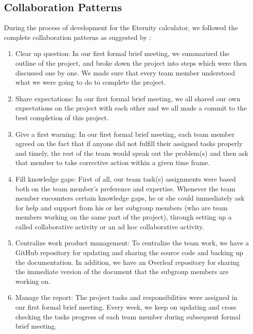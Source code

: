 \documentclass[12pt]{article}
\begin{document}
\subsection{Collaboration Patterns}
During the process of development for the Eternity calculator, we followed the complete collaboration patterns as suggested by \cite{koppe2015improving}:
\begin{enumerate}
    \item Clear up question: \newline
          In our first formal brief meeting, we summarized the outline of the project, and broke down the project into steps which were then discussed one by one. We made sure that every team member understood what we were going to do to complete the project.
    \item Share expectations: \newline
          In our first formal brief meeting, we all shared our own expectations on the project with each other and we all made a commit to the best completion of this project.
    \item Give a first warning: \newline
          In our first formal brief meeting, each team member agreed on the fact that if anyone did not fulfill their assigned tasks properly and timely, the rest of the team would speak out the problem(s) and then ask that member to take corrective action within a given time frame.
    \item Fill knowledge gaps: \newline
          First of all, our team task(s) assignments were based both on the team member's preference and expertise. Whenever the team member encounters certain knowledge gaps, he or she could immediately ask for help and support from his or her subgroup members (who are team members working on the same part of the project), through setting up a called collaborative activity or an ad hoc collaborative activity.
    \item Centralize work product management: \newline
          To centralize the team work, we have a GitHub repository for updating and sharing the source code and backing up the documentation. In addition, we have an Overleaf repository for sharing the immediate version of the document that the subgroup members are working on.
    \item Manage the report: \newline
          The project tasks and responsibilities were assigned in our first formal brief meeting. Every week, we keep on updating and cross checking the tasks progress of each team member during subsequent formal brief meeting.

\end{enumerate}
\end{document}
